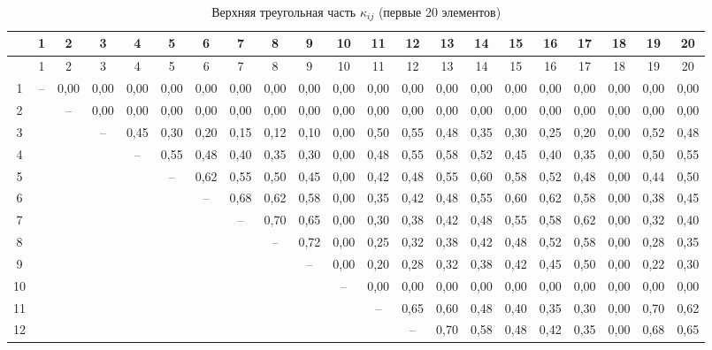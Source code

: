 \documentclass[12pt,a4paper]{article}
\begin{document}
	{\tiny
		\begin{longtable}{c|*{20}{c}}
			\caption{Верхняя треугольная часть \(\kappa_{ij}\) (первые 20 элементов)} \label{tab:kappa-full-20} \\
			\toprule
			& 1 & 2 & 3 & 4 & 5 & 6 & 7 & 8 & 9 & 10 & 11 & 12 & 13 & 14 & 15 & 16 & 17 & 18 & 19 & 20 \\
			\midrule
			\endfirsthead
			\toprule
			& 1 & 2 & 3 & 4 & 5 & 6 & 7 & 8 & 9 & 10 & 11 & 12 & 13 & 14 & 15 & 16 & 17 & 18 & 19 & 20 \\
			\midrule
			\endhead
			1  & – & 0,00 & 0,00 & 0,00 & 0,00 & 0,00 & 0,00 & 0,00 & 0,00 & 0,00 & 0,00 & 0,00 & 0,00 & 0,00 & 0,00 & 0,00 & 0,00 & 0,00 & 0,00 & 0,00 \\
			2  &   & – & 0,00 & 0,00 & 0,00 & 0,00 & 0,00 & 0,00 & 0,00 & 0,00 & 0,00 & 0,00 & 0,00 & 0,00 & 0,00 & 0,00 & 0,00 & 0,00 & 0,00 & 0,00 \\
			3  &   &   & – & 0,45 & 0,30 & 0,20 & 0,15 & 0,12 & 0,10 & 0,00 & 0,50 & 0,55 & 0,48 & 0,35 & 0,30 & 0,25 & 0,20 & 0,00 & 0,52 & 0,48 \\
			4  &   &   &   & – & 0,55 & 0,48 & 0,40 & 0,35 & 0,30 & 0,00 & 0,48 & 0,55 & 0,58 & 0,52 & 0,45 & 0,40 & 0,35 & 0,00 & 0,50 & 0,55 \\
			5  &   &   &   &   & – & 0,62 & 0,55 & 0,50 & 0,45 & 0,00 & 0,42 & 0,48 & 0,55 & 0,60 & 0,58 & 0,52 & 0,48 & 0,00 & 0,44 & 0,50 \\
			6  &   &   &   &   &   & – & 0,68 & 0,62 & 0,58 & 0,00 & 0,35 & 0,42 & 0,48 & 0,55 & 0,60 & 0,62 & 0,58 & 0,00 & 0,38 & 0,45 \\
			7  &   &   &   &   &   &   & – & 0,70 & 0,65 & 0,00 & 0,30 & 0,38 & 0,42 & 0,48 & 0,55 & 0,58 & 0,62 & 0,00 & 0,32 & 0,40 \\
			8  &   &   &   &   &   &   &   & – & 0,72 & 0,00 & 0,25 & 0,32 & 0,38 & 0,42 & 0,48 & 0,52 & 0,58 & 0,00 & 0,28 & 0,35 \\
			9  &   &   &   &   &   &   &   &   & – & 0,00 & 0,20 & 0,28 & 0,32 & 0,38 & 0,42 & 0,45 & 0,50 & 0,00 & 0,22 & 0,30 \\
			10 &   &   &   &   &   &   &   &   &   & – & 0,00 & 0,00 & 0,00 & 0,00 & 0,00 & 0,00 & 0,00 & 0,00 & 0,00 & 0,00 \\
			11 &   &   &   &   &   &   &   &   &   &   & – & 0,65 & 0,60 & 0,48 & 0,40 & 0,35 & 0,30 & 0,00 & 0,70 & 0,62 \\
			12 &   &   &   &   &   &   &   &   &   &   &   & – & 0,70 & 0,58 & 0,48 & 0,42 & 0,35 & 0,00 & 0,68 & 0,65 \\

\end{longtable}}
\end{document}
